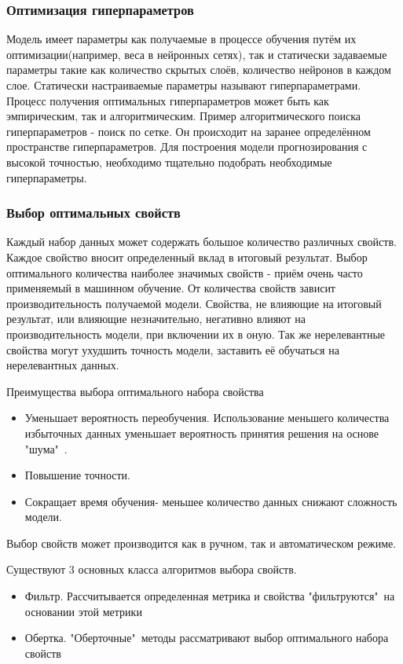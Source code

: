 \subsubsection{Оптимизация гиперпараметров}
Модель имеет параметры как получаемые в процессе обучения путём их оптимизации(например, веса в нейронных сетях), 
так и статически задаваемые параметры такие как количество скрытых слоёв, количество нейронов в каждом слое. Статически настраиваемые параметры называют гиперпараметрами. Процесс получения оптимальных гиперпараметров может быть как эмпирическим, так и алгоритмическим. Пример алгоритмического поиска гиперпараметров - поиск по сетке. Он происходит на заранее определённом пространстве гиперпараметров. Для построения модели прогнозирования с высокой точностью, необходимо тщательно подобрать необходимые гиперпараметры.

\subsubsection{Выбор оптимальных свойств}
Каждый набор данных может содержать большое количество различных свойств. Каждое свойство вносит определенный вклад в итоговый результат. Выбор оптимального количества наиболее значимых свойств - приём очень часто применяемый в машинном обучение. От количества свойств зависит производительность получаемой модели. Свойства, не влияющие на итоговый результат, или влияющие незначительно, негативно влияют на производительность модели, при включении их в оную. Так же нерелевантные свойства могут ухудшить точность модели, заставить её обучаться на нерелевантных данных\cite{Book14}.

Преимущества выбора оптимального набора свойства
\begin{itemize}
	\item Уменьшает вероятность переобучения. Использование меньшего количества избыточных данных уменьшает вероятность принятия решения на основе "шума"\ .
	\item Повышение точности.
	\item Сокращает время обучения- меньшее количество данных снижают сложность модели.
\end{itemize}
Выбор свойств может производится как в ручном, так и автоматическом режиме.

Существуют 3 основных класса алгоритмов выбора свойств.
\begin{itemize}
\item Фильтр. Рассчитывается определенная метрика и свойства "фильтруются"\ на основании этой метрики
\item Обертка. "Оберточные"\ методы рассматривают выбор оптимального набора свойств
\end{itemize}


